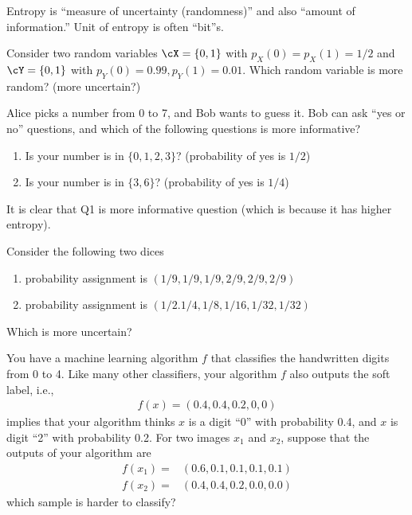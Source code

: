 \documentclass{article}
\begin{document}
Entropy is ``measure of uncertainty (randomness)'' and also ``amount of information.''
Unit of entropy is often ``bit''s.

\begin{example}
    Consider two random variables $\cX = \{0, 1\}$ with $p_X(0) = p_X(1) = 1/2$
    and $\cY = \{0, 1\}$ with $p_Y(0) = 0.99, p_Y(1) = 0.01$.
    Which random variable is more random? (more uncertain?)
\end{example}

\begin{example}
    Alice picks a number from 0 to 7, and Bob wants to guess it.
    Bob can ask ``yes or no'' questions, and which of the following questions is more informative?
    \begin{enumerate} [(Q1)]
        \item Is your number is in $\{0, 1, 2, 3\}$? (probability of yes is $1/2$)
        \item Is your number is in $\{3, 6\}$? (probability of yes is $1/4$)
    \end{enumerate}
    It is clear that Q1 is more informative question (which is because it has higher entropy).
\end{example}

\begin{example}[Dice]
    Consider the following two dices
    \begin{enumerate}[(D1)]
        \item probability assignment is $(1/9, 1/9, 1/9, 2/9, 2/9, 2/9)$
        \item probability assignment is $(1/2. 1/4, 1/8, 1/16, 1/32, 1/32)$
    \end{enumerate}
    Which is more uncertain?
\end{example}

\begin{example}[Classifier]
    You have a machine learning algorithm $f$ that classifies the handwritten digits from 0 to 4.
    Like many other classifiers, your algorithm $f$ also outputs the soft label, i.e.,
    \begin{align}
        f(x) = (0.4, 0.4, 0.2, 0, 0)
    \end{align}
    implies that your algorithm thinks $x$ is a digit ``0'' with probability 0.4, and $x$ is digit ``2'' with probability 0.2.
    For two images $x_1$ and $x_2$, suppose that the outputs of your algorithm are
    \begin{align}
        f(x_1) =& (0.6, 0.1, 0.1, 0.1, 0.1)\\
        f(x_2) =& (0.4, 0.4, 0.2, 0.0, 0.0)
    \end{align}
    which sample is harder to classify?
\end{example}
\end{document}
